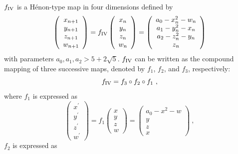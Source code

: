 \documentclass[12pt]{iopart}
\begin{document}
$f_{\rm IV}$ is a H\'{e}non-type map in four dimensions defined by
\begin{equation}\label{eq:4D triply folded Henon}
\left( \begin{array}{ccc}
x_{n+1}\\
y_{n+1} \\
z_{n+1} \\
w_{n+1} \end{array} \right) = 
f_{\rm IV} \left( \begin{array}{ccc}
x_{n}\\
y_{n} \\
z_{n} \\
w_{n} \end{array} \right) =
\left( \begin{array}{ccc}
a_0 - x^2_n - w_n\\
a_1 - y^2_n - x_n\\
a_2 - z^2_n -y_n\\
z_n \end{array} \right)
\end{equation}
with parameters $a_0,a_1,a_2 > 5+2\sqrt{5}$. $f_{\rm IV}$ can be written as the compound mapping of three successive maps, denoted by $f_1$, $f_2$, and $f_3$, respectively:
\begin{equation}\label{eq:4D triply folded Henon compound}
f_{\rm IV} =f_3 \circ f_2 \circ f_1\ ,
\end{equation}
where $f_1$ is expressed as
\begin{equation}\label{eq:f_1}
\left( \begin{array}{ccc}
x^{\prime}\\
y^{\prime} \\
z^{\prime} \\
w^{\prime} \end{array} \right) = 
f_1 \left( \begin{array}{ccc}
x\\
y \\
z \\
w \end{array} \right) =
\left( \begin{array}{ccc}
a_0 - x^2 - w\\
y \\
z \\
x \end{array} \right)\ ,
\end{equation}
$f_2$ is expressed as
\end{document}
